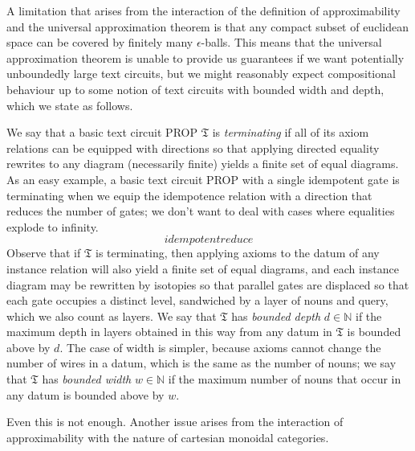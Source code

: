 \begin{example}

\end{example}

A limitation that arises from the interaction of the definition of approximability and the universal approximation theorem is that any compact subset of euclidean space can be covered by finitely many $\epsilon$-balls. This means that the universal approximation theorem is unable to provide us guarantees if we want potentially unboundedly large text circuits, but we might reasonably expect compositional behaviour up to some notion of text circuits with bounded width and depth, which we state as follows.

\begin{defn}
We say that a basic text circuit PROP $\mathfrak{T}$ is \emph{terminating} if all of its axiom relations can be equipped with directions so that applying directed equality rewrites to any diagram (necessarily finite) yields a finite set of equal diagrams. As an easy example, a basic text circuit PROP with a single idempotent gate is terminating when we equip the idempotence relation with a direction that reduces the number of gates; we don't want to deal with cases where equalities explode to infinity.
\[idempotentreduce\]
Observe that if $\mathfrak{T}$ is terminating, then applying axioms to the datum of any instance relation will also yield a finite set of equal diagrams, and each instance diagram may be rewritten by isotopies so that parallel gates are displaced so that each gate occupies a distinct level, sandwiched by a layer of nouns and query, which we also count as layers. We say that $\mathfrak{T}$ has \emph{bounded depth} $d \in \mathbb{N}$ if the maximum depth in layers obtained in this way from any datum in $\mathfrak{T}$ is bounded above by $d$. The case of width is simpler, because axioms cannot change the number of wires in a datum, which is the same as the number of nouns; we say that $\mathfrak{T}$ has \emph{bounded width} $w \in \mathbb{N}$ if the maximum number of nouns that occur in any datum is bounded above by $w$.
\end{defn}

Even this is not enough. Another issue arises from the interaction of approximability with the nature of cartesian monoidal categories.

\begin{theorem}

\end{theorem}

